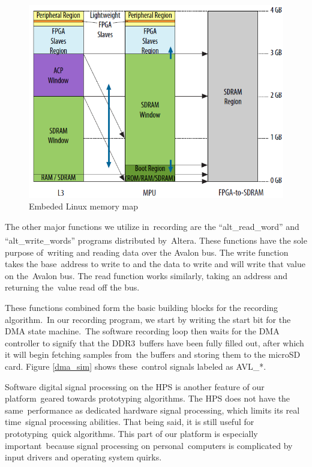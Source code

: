 \documentclass{article}
\begin{document}
\begin{figure}[ht]
	\begin{center}
	\includegraphics[scale=.38]{pictures/mmap.png}
	\caption{Embeded Linux memory map \cite{mmap}}
	\label{mmap}
	\end{center}
\end{figure}

The other major functions we utilize in\
recording are the ``alt\_read\_word'' and ``alt\_write\_words'' programs distributed by\
Altera\textsuperscript{\textregistered{}}. These functions have the sole purpose of\
writing and reading data over the Avalon bus. The write function takes the base\
address to write to and the data to write and will write that value on the\
Avalon bus. The read function works similarly, taking an address and returning the\
value read off the bus. 

These functions combined form the basic building blocks for the recording algorithm.\
In our recording program, we start by writing the start bit for the DMA state machine.\
The software recording loop then waits for the DMA controller to signify that the DDR3\
buffers have been fully filled out, after which it will begin fetching samples from\
the buffers and storing them to the microSD card. Figure \ref{dma_sim} shows these\
control signals labeled as AVL\_*.

Software digital signal processing on the HPS is another feature of our platform\
geared towards prototyping algorithms. The HPS does not have the same\
performance as dedicated hardware signal processing, which limits its real time\
signal processing abilities. That being said, it is still useful for prototyping\
quick algorithms. This part of our platform is especially important\
because signal processing on personal\
computers is complicated by input drivers and operating system quirks.
\end{document}
